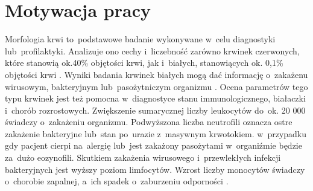 \section{Motywacja pracy}
\label{sec:motywacja_pracy}
Morfologia krwi to~podstawowe badanie wykonywane w~celu diagnostyki lub~profilaktyki. Analizuje ono cechy i~liczebność zarówno krwinek czerwonych, które stanowią ok.40\% objętości krwi, jak i~białych, stanowiących ok. 0,1\% objętości krwi \cite{krwiodawcy_sklad_krwi}. Wyniki badania krwinek białych mogą dać informację o~zakażenu wirusowym, bakteryjnym lub~pasożytniczym organizmu \cite{morfologia_krwi_wyniki_interpretacja}. Ocena parametrów tego typu krwinek jest też pomocna w~diagnostyce stanu immunologicznego, białaczki i~chorób rozrostowych. Zwiększenie sumarycznej liczby leukocytów do~ok. 20 000 świadczy o~zakażeniu organizmu. Podwyższona liczba neutrofili oznacza ostre zakażenie bakteryjne lub~stan po~urazie z~masywnym krwotokiem. w~przypadku gdy pacjent cierpi na~alergię lub~jest zakażony pasożytami w~organiźmie będzie za~dużo eozynofili. Skutkiem zakażenia wirusowego i~przewlekłych infekcji bakteryjnych jest wyższy poziom limfocytów. Wzrost liczby monocytów świadczy o~chorobie zapalnej, a~ich spadek o~zaburzeniu odporności \cite{morfologia_krwi_wyniki_interpretacja}.

